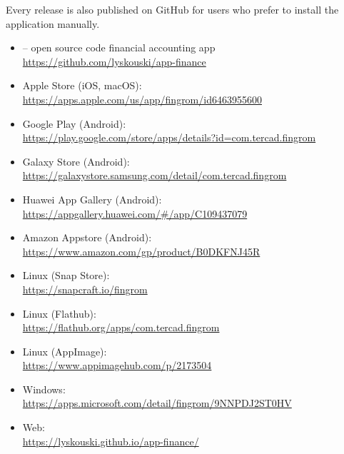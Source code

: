 \noindent Every release is also published on GitHub for users who prefer to install the
application manually.

\begin{itemize}[leftmargin=*]

\item {} -- open source code financial accounting app\\
\href{https://github.com/lyskouski/app-finance}{\small https://github.com/lyskouski/app-finance}

\item Apple Store (iOS, macOS):\\
\href{https://apps.apple.com/us/app/fingrom/id6463955600}{\small https://apps.apple.com/us/app/fingrom/id6463955600}

\item Google Play (Android):\\
\href{https://play.google.com/store/apps/details?id=com.tercad.fingrom}{\small https://play.google.com/store/apps/details?id=com.tercad.fingrom}

\item Galaxy Store (Android):\\
\href{https://galaxystore.samsung.com/detail/com.tercad.fingrom}{\small https://galaxystore.samsung.com/detail/com.tercad.fingrom}

\item Huawei App Gallery (Android):\\
\href{https://appgallery.huawei.com/\#/app/C109437079}{\small https://appgallery.huawei.com/\#/app/C109437079}

\item Amazon Appstore (Android):\\
\href{https://www.amazon.com/gp/product/B0DKFNJ45R}{\small https://www.amazon.com/gp/product/B0DKFNJ45R}

\item Linux (Snap Store):\\
\href{https://snapcraft.io/fingrom}{\small https://snapcraft.io/fingrom}

\item Linux (Flathub):\\
\href{https://flathub.org/apps/com.tercad.fingrom}{\small https://flathub.org/apps/com.tercad.fingrom}

\item Linux (AppImage):\\
\href{https://www.appimagehub.com/p/2173504}{\small https://www.appimagehub.com/p/2173504}

\item Windows:\\
\href{https://apps.microsoft.com/detail/fingrom/9NNPDJ2ST0HV}{\small https://apps.microsoft.com/detail/fingrom/9NNPDJ2ST0HV}

\item Web:\\
\href{https://lyskouski.github.io/app-finance/}{\small https://lyskouski.github.io/app-finance/}

\end{itemize}


